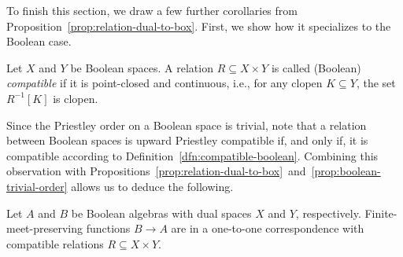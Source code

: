 To finish this section, we draw a few further corollaries from Proposition~\ref{prop:relation-dual-to-box}. First, we show how it specializes to the Boolean case.

\begin{definition}\label{dfn:compatible-boolean}
Let $X$ and $Y$ be Boolean spaces. A relation $R \subseteq X \times Y$ is called (Boolean) \emph{compatible} if it is point-closed and continuous, i.e., for any clopen $K \subseteq Y$, the set $R^{-1}[K]$ is clopen.
\end{definition}
Since the Priestley order on a Boolean space is trivial, note that a relation between Boolean spaces is upward Priestley compatible if, and only if, it is compatible according to Definition~\ref{dfn:compatible-boolean}. Combining this observation with Propositions~\ref{prop:relation-dual-to-box}~and~\ref{prop:boolean-trivial-order} allows us to deduce the following.
\begin{corollary}
Let $A$ and $B$ be Boolean algebras with dual spaces $X$ and $Y$, respectively. Finite-meet-preserving functions $B \to A$ are in a one-to-one correspondence with compatible relations $R \subseteq X \times Y$.
\end{corollary}

